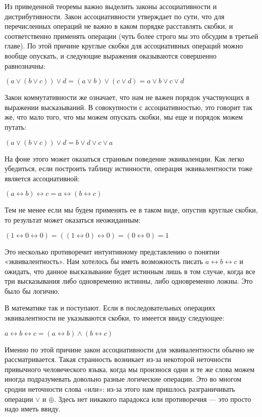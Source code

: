 Из приведенной теоремы важно выделить законы ассоциативности и дистрибутивности. Закон ассоциативности утверждает по сути, что для перечисленных операций не важно в каком порядке расставлять скобки, и соответственно применять операции (чуть более строго мы это обсудим в третьей главе). По этой причине круглые скобки для ассоциативных операций можно вообще опускать, и следующие выражения оказываются совершенно равнозначны:

$(a \vee (b \vee c)) \vee d = (a \vee b) \vee (c \vee d) = a \vee b \vee c \vee d$

Закон коммутативности же означает, что нам не важен порядок участвующих в выражении высказываний. В совокупности с ассоциативностью, это говорит так же, что мало того, что мы можем опускать скобки, мы еще и порядок можем путать:

$(a \vee (b \vee c)) \vee d = b \vee d \vee c \vee a$

На фоне этого может оказаться странным поведение эквиваленции. Как легко убедиться, если построить таблицу истинности, операция эквивалентности тоже является ассоциативной:

$(a \leftrightarrow b) \leftrightarrow c = a \leftrightarrow (b \leftrightarrow c)$

Тем не менее если мы будем применять ее в таком виде, опустив круглые скобки, то результат может оказаться неожиданным:

$(1 \leftrightarrow 0 \leftrightarrow 0) = ((1 \leftrightarrow 0) \leftrightarrow 0) = (0 \leftrightarrow 0) = 1$

Это несколько противоречит интуитивному представлению о понятии «эквивалентность». Нам хотелось бы иметь возможность писать $a \leftrightarrow b \leftrightarrow c$ и ожидать, что данное высказывание будет истинным лишь в том случае, когда все три высказывания либо одновременно истинны, либо одновременно ложны. Это было бы логично.

В математике так и поступают. Если в последовательных операциях эквивалентности не указываются скобки, то имеется ввиду следующее:

$a \leftrightarrow b \leftrightarrow c = (a \leftrightarrow b) \wedge (b \leftrightarrow c)$

Именно по этой причине закон ассоциативности для эквивалентности обычно не рассматривается. Такая странность возникает из-за некоторой неточности привычного человеческого языка, когда мы произнося одни и те же слова можем иногда подразумевать довольно разные логические операции. Это во многом сродни неточности слова «или»: из-за этого нам пришлось разграничивать операции $\vee$ и $\oplus$. Здесь нет никакого парадокса или противоречия — это просто надо иметь ввиду.

